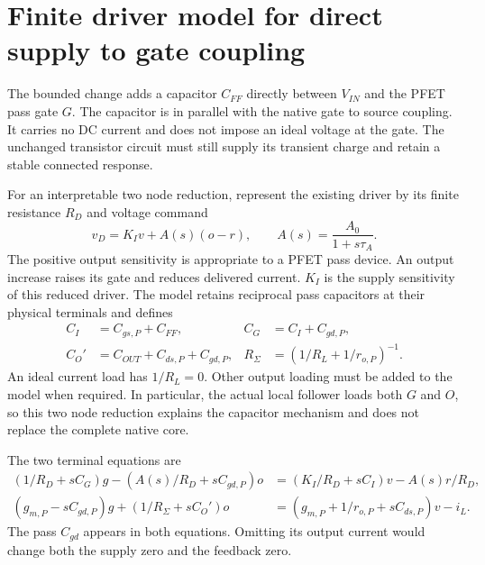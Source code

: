 \section{Finite driver model for direct supply to gate coupling}
The bounded change adds a capacitor $C_{FF}$ directly between $V_{IN}$
and the PFET pass gate $G$. The capacitor is in parallel with the native
gate to source coupling. It carries no DC current and does not impose
an ideal voltage at the gate. The unchanged transistor circuit must
still supply its transient charge and retain a stable connected response.

For an interpretable two node reduction, represent the existing driver
by its finite resistance $R_D$ and voltage command
\begin{equation}
v_D=K_Iv+A(s)(o-r),\qquad A(s)=\frac{A_0}{1+s\tau_A}.
\end{equation}
The positive output sensitivity is appropriate to a PFET pass device.
An output increase raises its gate and reduces delivered current.
$K_I$ is the supply sensitivity of this reduced driver. The model retains
reciprocal pass capacitors at their physical terminals and defines
\begin{align}
C_I&=C_{gs,P}+C_{FF},& C_G&=C_I+C_{gd,P},\\
C_O'&=C_{OUT}+C_{ds,P}+C_{gd,P},&
R_\Sigma&=(1/R_L+1/r_{o,P})^{-1}.
\end{align}
An ideal current load has $1/R_L=0$. Other output loading must be added
to the model when required. In particular, the actual local follower
loads both $G$ and $O$, so this two node reduction explains the capacitor
mechanism and does not replace the complete native core.

The two terminal equations are
\begin{align}
\left(1/R_D+sC_G\right)g
 -\left(A(s)/R_D+sC_{gd,P}\right)o
 &=\left(K_I/R_D+sC_I\right)v-A(s)r/R_D,\\
\left(g_{m,P}-sC_{gd,P}\right)g
 +\left(1/R_\Sigma+sC_O'\right)o
 &=\left(g_{m,P}+1/r_{o,P}+sC_{ds,P}\right)v-i_L.
\end{align}
The pass $C_{gd}$ appears in both equations. Omitting its output current
would change both the supply zero and the feedback zero.

